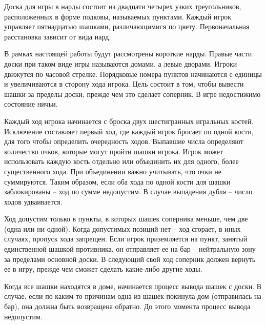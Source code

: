 Доска для игры в нарды состоит из двадцати четырех узких треугольников, расположенных в форме подковы, называемых пунктами. Каждый игрок управляет пятнадцатью шашками, различающимися по цвету. Первоначальная расстановка зависит от вида нард.

В рамках настоящей работы будут рассмотрены короткие нарды. Правые части доски при таком виде игры называются домами, а левые дворами. Игроки движутся по часовой стрелке. Порядковые номера пунктов начинаются с единицы и увеличиваются в сторону хода игрока. Цель состоит в том, чтобы вывести шашки за пределы доски, прежде чем это сделает соперник. В игре недостижимо состояние ничьи.

Каждый ход игрока начинается с броска двух шестигранных игральных костей. Исключение составляет первый ход, где каждый игрок бросает по одной кости, для того чтобы определить очередность ходов. Выпавшие числа определяют количество очков, которые могут пройти шашки игрока. Игрок может использовать каждую кость отдельно или объединить их для одного, более существенного хода. При объединении важно учитывать, что очки не суммируются. Таким образом, если оба хода по одной кости для шашки заблокированы -- ход по сумме недопустим. В случае выпадения дубля -- число ходов удваивается.

Ход допустим только в пункты, в которых шашек соперника меньше, чем две (одна или ни одной). Когда допустимых позиций нет -- ход сгорает, в иных случаях, пропуск хода запрещен. Если игрок приземляется на пункт, занятый единственной шашкой противника, он отправляет ее на бар -- нейтральную зону за пределами основной доски. В следующий свой ход соперник должен вернуть ее в игру, прежде чем сможет сделать какие-либо другие ходы.

Когда все шашки находятся в доме, начинается процесс вывода шашек с доски. В случае, если по каким-то причинам одна из шашек покинула дом (отправилась на бар), она должна быть возвращена обратно. До этого момента процесс вывода недопустим.
